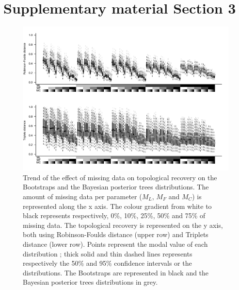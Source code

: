 \section{Supplementary material Section 3}

\begin{figure} 
\centering
    \includegraphics[width=1\textwidth]{SupplementaryMaterial/Supp_Figures/Boot+Baytre-AllParam-RF+Tr.pdf}
\caption{Trend of the effect of missing data on topological recovery on the Bootstraps and the Bayesian posterior trees distributions. The amount of missing data per parameter ($M_{L}$, $M_{F}$ and $M_{C}$) is represented along the x axis. The colour gradient from white to black represents respectively, 0\%, 10\%, 25\%, 50\% and 75\% of missing data. The topological recovery is represented on the y axis, both using Robinson-Foulds distance (upper row) and Triplets distance (lower row). Points represent the modal value of each distribution ; thick solid and thin dashed lines represents respectively the 50\% and 95\% confidence intervals or the distributions. The Bootstraps are represented in black and the Bayesian posterior trees distributions in grey.}
\label{Fig_global_BootTreesets} %
\end{figure}

